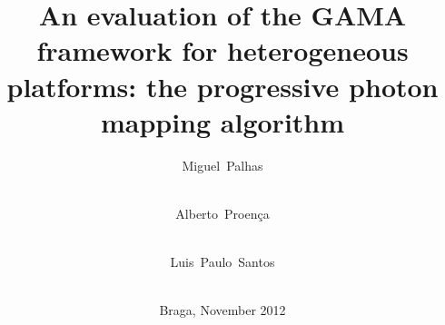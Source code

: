 \titlehead{%
University~of~Minho\hfill Informatics~Department%
}

\subject{Dissertation for Master’s Degree in Informatics Engineering}

\author{%
Miguel~Palhas\\\student\\%
\and Alberto~Proença\\\advisor\\%
\and Luis~Paulo~Santos\\\coadvisor\\%
}

\title{An evaluation of the GAMA framework for heterogeneous platforms: the progressive photon mapping algorithm}

\date{Braga, November 2012}
